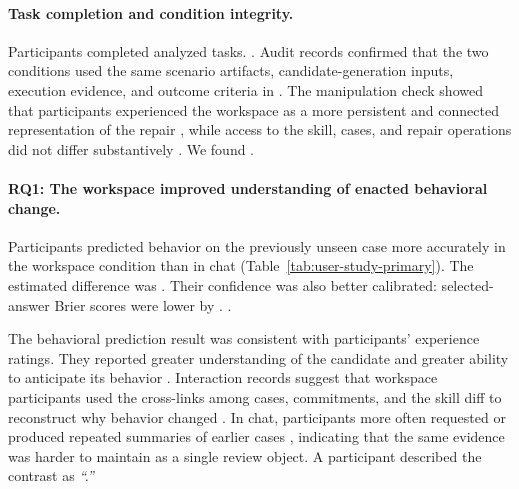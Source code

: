 \paragraph{Task completion and condition integrity.}
Participants completed  analyzed tasks.
. Audit records confirmed that the two conditions used
the same scenario artifacts, candidate-generation inputs, execution evidence,
and outcome criteria in . The manipulation check showed that participants experienced the
workspace as a more persistent and connected representation of the repair
, while access to the skill,
cases, and repair operations did not differ substantively
. We found
.

\paragraph{RQ1: The workspace improved understanding of enacted behavioral
change.}
Participants predicted behavior on the previously unseen case more accurately
in the workspace condition than in chat (Table~\ref{tab:user-study-primary}).
The estimated difference was . Their confidence was also better calibrated:
selected-answer Brier scores were lower by . .

The behavioral prediction result was consistent with participants' experience
ratings. They reported greater understanding of the candidate
 and greater ability to anticipate its
behavior . Interaction records suggest
that workspace participants used the cross-links among cases, commitments, and
the skill diff to reconstruct why behavior changed
. In chat,
participants more often requested or produced repeated summaries of earlier
cases , indicating that the same
evidence was harder to maintain as a single review object. A participant
described the contrast as \emph{``.''}

